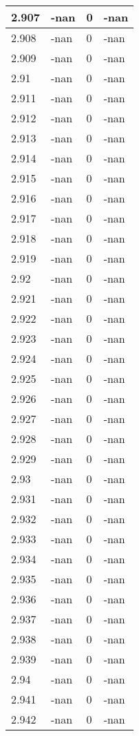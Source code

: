 \documentclass[a4paper,14pt]{extarticle}
\begin{document}
\begin{longtable}{||m{3cm}||m{3cm}|m{3cm}||m{3cm}||}
\hline
2.907 & -nan & 0 & -nan\\
\hline
2.908 & -nan & 0 & -nan\\
\hline
2.909 & -nan & 0 & -nan\\
\hline
2.91 & -nan & 0 & -nan\\
\hline
2.911 & -nan & 0 & -nan\\
\hline
2.912 & -nan & 0 & -nan\\
\hline
2.913 & -nan & 0 & -nan\\
\hline
2.914 & -nan & 0 & -nan\\
\hline
2.915 & -nan & 0 & -nan\\
\hline
2.916 & -nan & 0 & -nan\\
\hline
2.917 & -nan & 0 & -nan\\
\hline
2.918 & -nan & 0 & -nan\\
\hline
2.919 & -nan & 0 & -nan\\
\hline
2.92 & -nan & 0 & -nan\\
\hline
2.921 & -nan & 0 & -nan\\
\hline
2.922 & -nan & 0 & -nan\\
\hline
2.923 & -nan & 0 & -nan\\
\hline
2.924 & -nan & 0 & -nan\\
\hline
2.925 & -nan & 0 & -nan\\
\hline
2.926 & -nan & 0 & -nan\\
\hline
2.927 & -nan & 0 & -nan\\
\hline
2.928 & -nan & 0 & -nan\\
\hline
2.929 & -nan & 0 & -nan\\
\hline
2.93 & -nan & 0 & -nan\\
\hline
2.931 & -nan & 0 & -nan\\
\hline
2.932 & -nan & 0 & -nan\\
\hline
2.933 & -nan & 0 & -nan\\
\hline
2.934 & -nan & 0 & -nan\\
\hline
2.935 & -nan & 0 & -nan\\
\hline
2.936 & -nan & 0 & -nan\\
\hline
2.937 & -nan & 0 & -nan\\
\hline
2.938 & -nan & 0 & -nan\\
\hline
2.939 & -nan & 0 & -nan\\
\hline
2.94 & -nan & 0 & -nan\\
\hline
2.941 & -nan & 0 & -nan\\
\hline
2.942 & -nan & 0 & -nan\\

\end{longtable}
\end{document}
